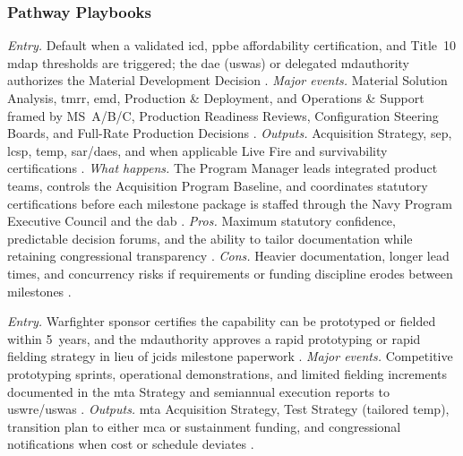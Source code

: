 \documentclass[../main.tex]{subfiles}
\begin{document}
\subsubsection{Pathway Playbooks}
\begin{description}[style=nextline,labelsep=0.5em,font=\bfseries]
  \item[Major Capability Acquisition.]
        \textit{Entry.} Default when a validated \ac{icd}, \ac{ppbe} affordability certification, and Title~10 \ac{mdap} thresholds are triggered; the \ac{dae} (\ac{uswas}) or delegated \ac{mdauthority} authorizes the Material Development Decision \autocite{DoDI5000-02,DoDI5000-85,USC-10-4201}.
        \textit{Major events.} Material Solution Analysis, \ac{tmrr}, \ac{emd}, Production \& Deployment, and Operations \& Support framed by MS~A/B/C, Production Readiness Reviews, Configuration Steering Boards, and Full-Rate Production Decisions \autocite{DoDI5000-85}.
        \textit{Outputs.} Acquisition Strategy, \ac{sep}, \ac{lcsp}, \ac{temp}, \ac{sar}/\ac{daes}, and when applicable Live Fire and survivability certifications \autocite{DoDI5000-85,DoDI5000-89,USC-10-2366}.
        \textit{What happens.} The Program Manager leads integrated product teams, controls the Acquisition Program Baseline, and coordinates statutory certifications before each milestone package is staffed through the Navy Program Executive Council and the \ac{dab} \autocite{DoDI5000-85}.
        \textit{Pros.} Maximum statutory confidence, predictable decision forums, and the ability to tailor documentation while retaining congressional transparency \autocite{DoDI5000-85}.
        \textit{Cons.} Heavier documentation, longer lead times, and concurrency risks if requirements or funding discipline erodes between milestones \autocite{DoDI5000-85}.
  \item[Middle Tier of Acquisition.]
        \textit{Entry.} Warfighter sponsor certifies the capability can be prototyped or fielded within 5~years, and the \ac{mdauthority} approves a rapid prototyping or rapid fielding strategy in lieu of \ac{jcids} milestone paperwork \autocite{DoDI5000-80}.
        \textit{Major events.} Competitive prototyping sprints, operational demonstrations, and limited fielding increments documented in the \ac{mta} Strategy and semiannual execution reports to \ac{uswre}/\ac{uswas} \autocite{DoDI5000-80}.
        \textit{Outputs.} \ac{mta} Acquisition Strategy, Test Strategy (tailored \ac{temp}), transition plan to either \ac{mca} or sustainment funding, and congressional notifications when cost or schedule deviates \autocite{DoDI5000-80}.

\end{description}
\end{document}
